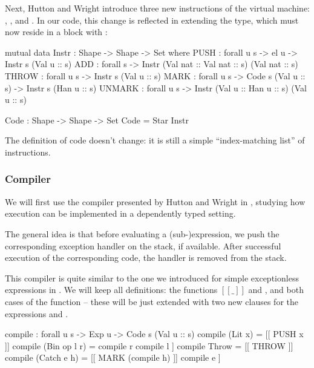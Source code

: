 Next, Hutton and Wright introduce three new instructions of the virtual machine:
, , and . In our code, this change
is reflected in extending the  type, which must now reside in a
 block with :

\label{sec:gmh-ham-instr}\begin{code}
  mutual
    data Instr : Shape -> Shape -> Set where
      PUSH : forall {u s} -> el u -> Instr s (Val u :: s)
      ADD : forall s -> Instr (Val nat :: Val nat :: s) (Val nat :: s)
      THROW : forall {u s} -> Instr s (Val u :: s)
      MARK : forall {u s} -> Code s (Val u :: s) -> Instr s (Han u :: s)
      UNMARK : forall {u s} -> Instr (Val u :: Han u :: s) (Val u :: s)

    Code : Shape -> Shape -> Set
    Code = Star Instr
\end{code}

\noindent The definition of code doesn't change: it is still a simple
``index-matching list'' of instructions.

\subsubsection{Compiler}

We will first use the compiler presented by Hutton and Wright in
\cite{gmh:exceptions}, studying how execution can be implemented in a
dependently typed setting.

The general idea is that before evaluating a (sub-)expression, we push
the corresponding exception handler on the stack, if available. After
successful execution of the corresponding code, the handler is removed
from the stack.

This compiler is quite similar to the one we introduced for simple
exceptionless expressions in . We will keep all
definitions: the functions $[\!\![\_]\!\!]$ and , and both cases
of the function  -- these will be just extended with two new
clauses for the expressions  and .

\label{sec:gmh-ham-compile}\begin{code}
compile : forall {u s} -> Exp u -> Code s (Val u :: s)
compile (Lit x) = [[ PUSH x ]]
compile (Bin op l r) = compile r \app compile l \app [[ opInstr op ]] 
compile Throw = [[ THROW ]]
compile (Catch e h) = [[ MARK (compile h) ]] \app compile e \app [[ UNMARK ]]
\end{code}

